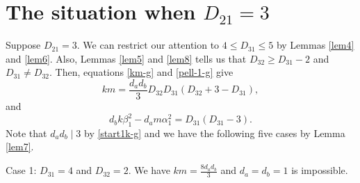 \documentclass[12pt]{article}
\begin{document}

\section{The situation when $D_{21} = 3$}
Suppose $D_{21} = 3$. We can restrict our attention to $4 \le D_{31} \le 5$ by Lemmas \ref{lem4} and \ref{lem6}. Also, Lemmas \ref{lem5} and \ref{lem8} tells us that $D_{32}\geq D_{31} - 2$ and $D_{31} \neq D_{32}$. Then, equations \eqref{km-g} and \eqref{pell-1-g} give
\[
km = \frac{d_a d_b}{3}{D_{32} D_{31} (D_{32} + 3 - D_{31})},
\]
and
\begin{equation} \label{pell-3}
d_b k \beta_1^2 - d_a m \alpha_1^2 = D_{31} (D_{31} - 3).
\end{equation}
Note that $d_a d_b \mid 3$ by \eqref{start1k-g} and we have the following five cases by Lemma \ref{lem7}.

\bigskip

Case 1: $D_{31}=4$ and $D_{32}=2$. We have $k m = \frac{8 d_a d_b}{3}$ and $d_a = d_b = 1$ is impossible.
\end{document}
